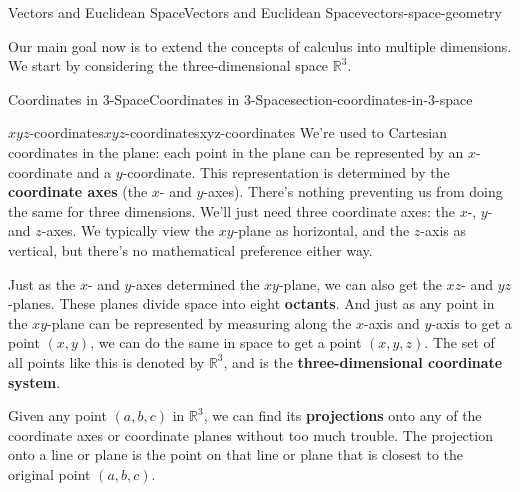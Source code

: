 \documentclass[oneside,10pt,]{book}
\newcommand{\terminology}[1]{\textbf{#1}}
\numberwithin{equation}{section}
\newcommand{\RR}{\mathbb{R}}
\begin{document}
%
%
\typeout{************************************************}
\typeout{************************************************}
%
\begin{chapterptx}{Vectors and Euclidean Space}{}{Vectors and Euclidean Space}{}{}{vectors-space-geometry}
\begin{introduction}{}%
\hypertarget{p-1061}{}%
Our main goal now is to extend the concepts of calculus into multiple dimensions. We start by considering the three-dimensional space \(\RR^{3}\).%
\end{introduction}%
%
%
\typeout{************************************************}
\typeout{************************************************}
%
\begin{sectionptx}{Coordinates in 3-Space}{}{Coordinates in 3-Space}{}{}{section-coordinates-in-3-space}
%
%
\typeout{************************************************}
\typeout{************************************************}
%
\begin{subsectionptx}{\(xyz\)-coordinates}{}{\(xyz\)-coordinates}{}{}{xyz-coordinates}
\hypertarget{p-1062}{}%
We're used to Cartesian coordinates in the plane: each point in the plane can be represented by an \(x\)-coordinate and a \(y\)-coordinate. This representation is determined by the \terminology{coordinate axes} (the \(x\)- and \(y\)-axes). There's nothing preventing us from doing the same for three dimensions. We'll just need three coordinate axes: the \(x\)-, \(y\)- and \(z\)-axes. We typically view the \(xy\)-plane as horizontal, and the \(z\)-axis as vertical, but there's no mathematical preference either way.%
\par
\hypertarget{p-1063}{}%
Just as the \(x\)- and \(y\)-axes determined the \(xy\)-plane, we can also get the \(xz\)- and \(yz\)-planes. These planes divide space into eight \terminology{octants}. And just as any point in the \(xy\)-plane can be represented by measuring along the \(x\)-axis and \(y\)-axis to get a point \((x,y)\), we can do the same in space to get a point \((x,y,z)\). The set of all points like this is denoted by \(\RR^{3}\), and is the \terminology{three-dimensional coordinate system}.%
\par
\hypertarget{p-1064}{}%
Given any point \((a,b,c)\) in \(\RR^{3}\), we can find its \terminology{projections} onto any of the coordinate axes or coordinate planes without too much trouble. The projection onto a line or plane is the point on that line or plane that is closest to the original point \((a,b,c)\).%

\end{subsectionptx}
\end{sectionptx}
\end{chapterptx}
\end{document}
